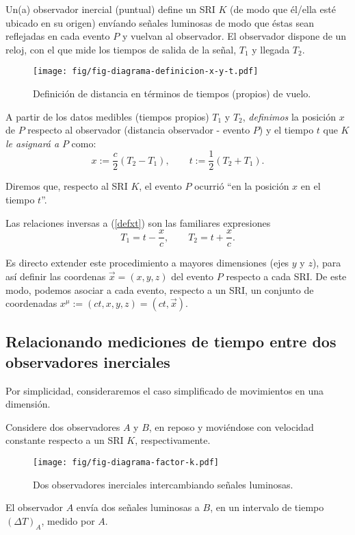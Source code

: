 Un(a) observador inercial (puntual) define un SRI $K$ (de modo que él/ella esté  ubicado en su origen) envíando se\~nales luminosas de modo que éstas sean reflejadas en cada evento $P$ y vuelvan al observador. El observador dispone de un reloj,  con el que mide los tiempos de salida de la se\~nal, $T_1$
y llegada $T_2$.
\begin{figure}[!h]
\centerline{\texttt{[image: fig/fig-diagrama-definicion-x-y-t.pdf]}}
 \caption{Definición de distancia en términos de tiempos (propios) de vuelo.}
\label{defdist}
\end{figure}
A partir de los datos medibles (tiempos propios) $T_1$ y $T_2$, \textit{definimos} la posición
$x$ de $P$ respecto al observador (distancia observador - evento $P$) y el
tiempo $t$ que $K$ \textit{le asignará a} $P$ como:
\begin{equation}\label{defxt}
\boxed{x:=\frac{c}{2}(T_2-T_1), \qquad t:=\frac{1}{2}(T_2+T_1).}
\end{equation}

Diremos que, respecto al SRI $K$, el evento $P$ ocurrió ``en la posición $x$ en el tiempo $t$''.

Las relaciones inversas a (\ref{defxt}) son las familiares expresiones
\begin{equation}\label{T1T2xt}
T_1=t-\frac{x}{c}, \qquad T_2=t+\frac{x}{c}.
\end{equation}


Es directo extender este procedimiento a mayores dimensiones (ejes $y$ y $z$), para así definir las coordenas $\vec{x}=(x,y,z)$ del evento $P$ respecto a cada SRI.
De este modo, podemos asociar a cada evento, respecto a un SRI, un conjunto de
coordenadas $x^\mu:=\left(ct,x,y,z\right)=(ct,\vec{x}) $.


\subsection{Relacionando mediciones de tiempo entre dos observadores inerciales}

Por simplicidad, consideraremos el caso simplificado de movimientos en
una dimensión.

Considere dos observadores $A$ y $B$, en reposo y moviéndose con
velocidad constante respecto a un SRI $K$, respectivamente.
\begin{figure}[H]
\centerline{\texttt{[image: fig/fig-diagrama-factor-k.pdf]}}
 \caption{Dos observadores inerciales intercambiando se\~nales luminosas.}
\label{k1}
\end{figure}
El observador $A$ envía dos se\~nales luminosas a $B$, en un intervalo de tiempo $(\Delta T)_A$, medido por $A$.

